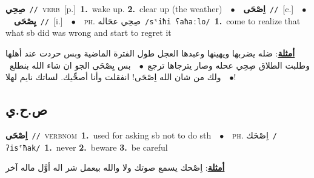 \documentclass[10pt,a4paper,twoside]{article} %
\begin{document}
\begin{multicols}{2}
{\setlength\topsep{0pt}\textbf{\foreignlanguage{arabic}{صِحِي}}\ {\color{gray}\texttt{//}\color{black}}\ \textsc{verb}\ [p.]\ \textbf{1.}~wake up.  \textbf{2.}~clear up (the weather)\ \ $\bullet$\ \ \setlength\topsep{0pt}\textbf{\foreignlanguage{arabic}{اِصْحَى}}\ {\color{gray}\texttt{//}\color{black}}\ [c.]\ \ $\bullet$\ \ \setlength\topsep{0pt}\textbf{\foreignlanguage{arabic}{يِصْحَى}}\ {\color{gray}\texttt{//}\color{black}}\ [i.]\ \ $\bullet$\ \ \textsc{ph.} \color{gray} \foreignlanguage{arabic}{صِحِي عحَاله}\color{black}\ {\color{gray}\texttt{/{\sffamily sˤiħi ʕaħaːlo}/}\color{black}}\ \textbf{1.}~come to realize that what sb did was wrong and start to regret it\  \begin{flushright}\color{gray}\foreignlanguage{arabic}{\textbf{\underline{\foreignlanguage{arabic}{أمثلة}}}: ضله يضربها ويهينها وعبدها العجل طول الفترة الماضية وبس حردت عند أهلها وطلبت الطلاق صِحِي عحله وصار يترجاها ترجع\ $\bullet$\ \  بس يِصْحَى الجو ان شاء الله بنطلع\ $\bullet$\ \  ولك من شان الله اِصْحَى! انفقلت وأنا أصحِّيك. لساتك نايم لهلا!}\end{flushright}\color{black}} \vspace{2mm}

\vspace{-3mm}
\subsection*{\color{blue}\foreignlanguage{arabic}{ص.ح.ي}\color{blue}{}} 

{\setlength\topsep{0pt}\textbf{\foreignlanguage{arabic}{اِصْحَى}}\ {\color{gray}\texttt{//}\color{black}}\ \textsc{verb\textunderscore nom}\ \textbf{1.}~used for asking sb not to do sth\ \ $\bullet$\ \ \textsc{ph.} \color{gray} \foreignlanguage{arabic}{اِصْحَك}\color{black}\ {\color{gray}\texttt{/{\sffamily ʔisˤħak}/}\color{black}}\ \textbf{1.}~never  \textbf{2.}~beware  \textbf{3.}~be careful\  \begin{flushright}\color{gray}\foreignlanguage{arabic}{\textbf{\underline{\foreignlanguage{arabic}{أمثلة}}}: اِصْحك يسمع صوتك ولا والله بيعمل شر اله أوَّل ماله آخر}\end{flushright}\color{black}} \vspace{2mm}


\end{multicols}
\end{document}
